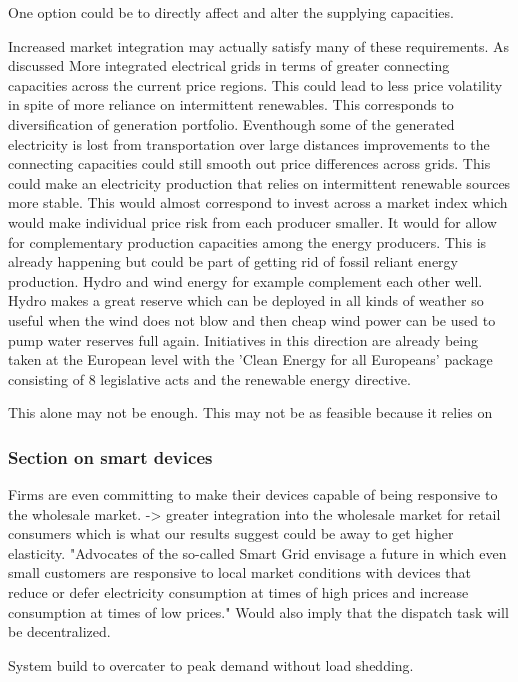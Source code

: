 One option could be to directly affect and alter the supplying capacities.

Increased market integration may actually satisfy many of these requirements. As discussed  More integrated electrical grids in terms of greater connecting capacities across the current price regions. This could lead to less price volatility in spite of more reliance on intermittent renewables. This corresponds to diversification of generation portfolio.  Eventhough some of the generated electricity is lost from transportation over large distances improvements to the connecting capacities could still smooth out price differences across grids. This could make an electricity production that relies on intermittent renewable sources more stable. This would almost correspond to invest across a market index which would make individual price risk from each producer smaller. It would for allow for complementary production capacities among the energy producers. This is already happening but could be part of getting rid of fossil reliant energy production. Hydro and wind energy for example complement each other well. Hydro makes a great reserve which can be deployed in all kinds of weather so useful when the wind does not blow and then cheap wind power can be used to pump water reserves full again. Initiatives in this direction are already being taken at the European level with the 'Clean Energy for all Europeans' package consisting of 8 legislative acts and the renewable energy directive.

This alone may not be enough. This may not be as feasible because it relies on

\subsubsection*{Section on smart devices}
Firms are even committing to make their devices capable of being responsive to the wholesale market. -> greater integration into the wholesale market for retail consumers which is what our results suggest could be away to get higher elasticity. 
"Advocates of the so-called Smart Grid envisage a future in which even small customers are responsive to local market conditions with devices that reduce or defer electricity consumption at times of high prices and increase consumption at times of low prices." Would also imply that the dispatch task will be decentralized. 

System build to overcater to peak demand without load shedding. 

